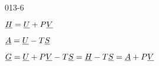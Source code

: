 \begin{mitframe}{013-6} %

    
\begin{listone}
        
    \item $\uline{\enthalpy} = \uline{\intenergy} + \p\uline{\vol}$
        
    \item $\uline{\helmholtz} = \uline{\intenergy} - \Temp\uline{\entropy}$
         
    \item $\uline{\gibbs} = \uline{\intenergy} + \p\uline{\vol} - \Temp\uline{\entropy} = \uline{\enthalpy} - \Temp\uline{\entropy} = \uline{\helmholtz} + \p\uline{\vol}$
    
\end{listone}			

\end{mitframe}
